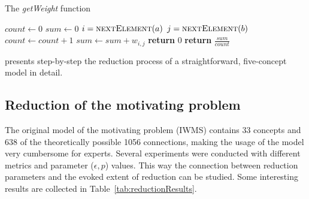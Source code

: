 \documentclass[graybox]{svmult}
\begin{document}
\begin{algorithm}
  \caption{The \emph{getWeight} function}\label{getWeight}
  \begin{algorithmic}[1]
      \State $count \gets 0$
      \State $sum \gets 0$
        \State $i = \Call{nextElement}{a}$
          \State $j = \Call{nextElement}{b}$
            \State $count \gets count + 1$
            \State $sum \gets sum + w_{i,j}$
          \EndIf
        \EndWhile
      \EndWhile
        \State \textbf{return} $0$
      \Else
        \State \textbf{return} $\frac{sum}{count}$
      \EndIf
    \EndFunction
  \end{algorithmic}
\end{algorithm}

\cite{papageorgiou2017concept} presents step-by-step the reduction 
process of a straightforward, five-concept model in detail.

\subsection{Reduction of the motivating problem}
\label{sec:reductionIWMS}

The original model of the motivating problem (IWMS) contains 33 
concepts and 638 of the theoretically possible 1056 connections, making 
the usage of the model very cumbersome for experts. Several experiments 
were conducted with different metrics and parameter ($\epsilon, p$) 
values. This way the connection between reduction parameters and the 
evoked extent of reduction can be studied. Some interesting results are 
collected in Table~\ref{tab:reductionResults}.
\end{document}
